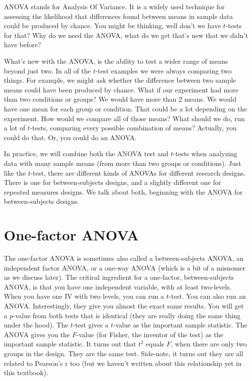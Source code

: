\documentclass[
  letterpaper,
  DIV=11,
  numbers=noendperiod]{scrreprt}
\begin{document}
ANOVA stands for Analysis Of Variance. It is a widely used technique for
assessing the likelihood that differences found between means in sample
data could be produced by chance. You might be thinking, well don't we
have \(t\)-tests for that? Why do we need the ANOVA, what do we get
that's new that we didn't have before?

What's new with the ANOVA, is the ability to test a wider range of means
beyond just two. In all of the \(t\)-test examples we were always
comparing two things. For example, we might ask whether the difference
between two sample means could have been produced by chance. What if our
experiment had more than two conditions or groups? We would have more
than 2 means. We would have one mean for each group or condition. That
could be a lot depending on the experiment. How would we compare all of
those means? What should we do, run a lot of \(t\)-tests, comparing
every possible combination of means? Actually, you could do that. Or,
you could do an ANOVA.

In practice, we will combine both the ANOVA test and \(t\)-tests when
analyzing data with many sample means (from more than two groups or
conditions). Just like the \(t\)-test, there are different kinds of
ANOVAs for different research designs. There is one for between-subjects
designs, and a slightly different one for repeated measures designs. We
talk about both, beginning with the ANOVA for between-subjects designs.

\section{One-factor ANOVA}\label{one-factor-anova}

The one-factor ANOVA is sometimes also called a between-subjects ANOVA,
an independent factor ANOVA, or a one-way ANOVA (which is a bit of a
misnomer as we discuss later). The critical ingredient for a one-factor,
between-subjects ANOVA, is that you have one independent variable, with
at least two-levels. When you have one IV with two levels, you can run a
\(t\)-test. You can also run an ANOVA. Interestingly, they give you
almost the exact same results. You will get a \(p\)-value from both
tests that is identical (they are really doing the same thing under the
hood). The \(t\)-test gives a \(t\)-value as the important sample
statistic. The ANOVA gives you the \(F\)-value (for Fisher, the inventor
of the test) as the important sample statistic. It turns out that
\(t^2\) equals \(F\), when there are only two groups in the design. They
are the same test. Side-note, it turns out they are all related to
Pearson's r too (but we haven't written about this relationship yet in
this textbook).
\end{document}
